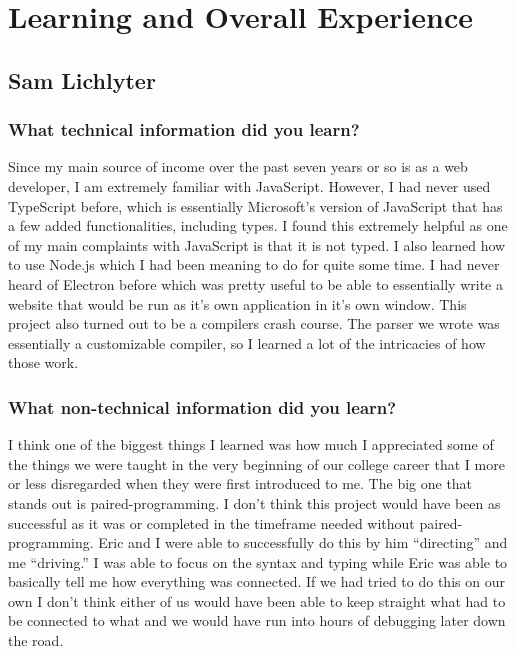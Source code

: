 \documentclass[letterpaper,10pt,titlepage,draftclsnofoot,onecolumn,onesided] {IEEEtran}
\begin{document}
\section{Learning and Overall Experience}

\subsection{Sam Lichlyter}
\subsubsection{What technical information did you learn?}
Since my main source of income over the past seven years or so is as a web developer, I am extremely familiar with JavaScript.
However, I had never used TypeScript before, which is essentially Microsoft's version of JavaScript that has a few added functionalities, including types.
I found this extremely helpful as one of my main complaints with JavaScript is that it is not typed.
I also learned how to use Node.js which I had been meaning to do for quite some time.
I had never heard of Electron before which was pretty useful to be able to essentially write a website that would be run as it's own application in it's own window.
This project also turned out to be a compilers crash course.
The parser we wrote was essentially a customizable compiler, so I learned a lot of the intricacies of how those work.\\

\subsubsection{What non-technical information did you learn?}
I think one of the biggest things I learned was how much I appreciated some of the things we were taught in the very beginning of our college career that I more or less disregarded when they were first introduced to me.
The big one that stands out is paired-programming.
I don't think this project would have been as successful as it was or completed in the timeframe needed without paired-programming.
Eric and I were able to successfully do this by him ``directing'' and me ``driving.''
I was able to focus on the syntax and typing while Eric was able to basically tell me how everything was connected.
If we had tried to do this on our own I don't think either of us would have been able to keep straight what had to be connected to what and we would have run into hours of debugging later down the road. \\
\end{document}
